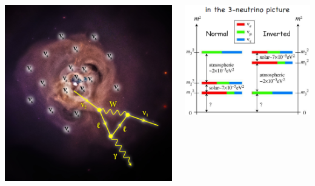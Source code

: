 \documentclass{beamer}
\begin{document}
\begin{frame}
\begin{minipage}[t]{0.80\paperwidth}
\begin{columns}
\begin{column}{0.50\linewidth}
\begin{tcolorbox}[colback=UNL@Cream!5,colframe=UNL@Cream!60,title=\textcolor{UMN@Maroon}{\textbf{Dark Matter.}}]
{    %
 \includegraphics[height=0.25\linewidth,width=0.45\linewidth]{THESISPLOTS/New-Physics-PLOTS/X-ray-Signature-DM-2014.png}
      }
        \end{tcolorbox}
   \end{column} 
   
   \begin{column}{0.50\linewidth}
         \begin{tcolorbox}[colback=UNL@Cream!5,colframe=UNL@Cream!60,title=\textcolor{UMN@Maroon}{\textbf{Neutrino Masses.}}]
   
          \includegraphics[height=0.35\linewidth,width=\linewidth]{THESISPLOTS/New-Physics-PLOTS/neutrino-Mass.png}
         \end{tcolorbox}
         

\end{column}
\end{columns}
\end{minipage}
\end{frame}
\end{document}
